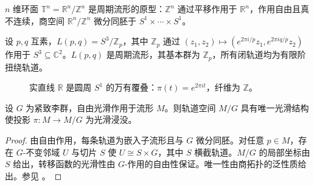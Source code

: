\begin{example}[环面作为周期流形]\label{ex:torus_periodic_manifold}
$n$ 维环面 $\mathbb{T}^n=\mathbb{R}^n/\mathbb{Z}^n$ 是周期流形的原型：$\mathbb{Z}^n$ 通过平移作用于 $\mathbb{R}^n$，作用自由且真不连续，商空间 $\mathbb{R}^n/\mathbb{Z}^n$ 微分同胚于 $S^1\times\cdots\times S^1$。
\end{example}

\begin{example}[透镜空间]\label{ex:lens_space}
设 $p,q$ 互素，$L(p,q)=S^3/\mathbb{Z}_p$，其中 $\mathbb{Z}_p$ 通过 $(z_1,z_2)\mapsto(e^{2\pi i/p}z_1,e^{2\pi i q/p}z_2)$ 作用于 $S^3\subseteq\mathbb{C}^2$。$L(p,q)$ 是周期流形，其基本群为 $\mathbb{Z}_p$，所有闭轨道均为有限阶扭绕轨道。
\end{example}

\begin{figure}[htbp]
\centering
{}
\caption{实直线 $\mathbb{R}$ 是圆周 $S^1$ 的万有覆叠：$\pi(t)=e^{2\pi i t}$，纤维为 $\mathbb{Z}$。}
\label{fig:covering_R_S1_periodic}
\end{figure}

\begin{proposition}[商流形的光滑性]\label{prop:quotient_smooth}
设 $G$ 为紧致李群，自由光滑作用于流形 $M$。则轨道空间 $M/G$ 具有唯一光滑结构使投影 $\pi:M\to M/G$ 为光滑浸没。
\end{proposition}

\begin{proof}
由自由作用，每条轨道为嵌入子流形且与 $G$ 微分同胚。对任意 $p\in M$，存在 $G$-不变邻域 $U$ 与切片 $S$ 使 $U\cong S\times G$，其中 $S$ 横截轨道。$M/G$ 的局部坐标由 $S$ 给出，转移函数的光滑性由 $G$-作用的自由性保证。唯一性由商拓扑的泛性质给出。参见 \cite{wang2023manifolds}。
\end{proof}

